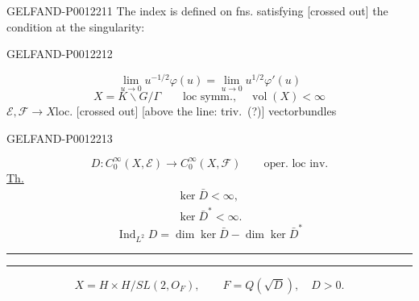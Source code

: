 \begin{GelfandAdjacentEvidence}{GELFAND-P001221}{1}
The index is defined on fns. satisfying [crossed out] the condition at the singularity:
\end{GelfandAdjacentEvidence}
\begin{GelfandAdjacentEvidence}{GELFAND-P001221}{2}

\begin{equation*}
\lim_{u\to0}u^{-1/2}\varphi(u)=\lim_{u\to0}u^{1/2}\varphi'(u)
\end{equation*}
\begin{equation*}
X=K\backslash G/\Gamma\qquad\text{loc symm.},\quad\operatorname{vol}(X)<\infty
\end{equation*}
\(\mathcal E,\mathcal F\longrightarrow X\)\quad loc. [crossed out]
[above the line: triv.\ (?)] vectorbundles
\end{GelfandAdjacentEvidence}
\begin{GelfandAdjacentEvidence}{GELFAND-P001221}{3}

\begin{equation*}
D:C_0^\infty(X,\mathcal E)\longrightarrow C_0^\infty(X,\mathcal F)
\qquad\text{oper. loc inv.}
\end{equation*}
\underline{Th.}
\begin{equation*}
\begin{gathered}
\ker\bar D<\infty,\\
\ker\bar D^*<\infty.
\end{gathered}
\end{equation*}
\begin{equation*}
\operatorname{Ind}_{L^2}D=\dim\ker\bar D-\dim\ker\bar D^*
\end{equation*}
\begin{center}\rule{.9em}{.35pt}\quad\rule{.9em}{.35pt}\end{center}
\begin{equation*}
X=H\times H/SL(2,O_F),\qquad F=Q(\sqrt D),\quad D>0.
\end{equation*}
\end{GelfandAdjacentEvidence}
